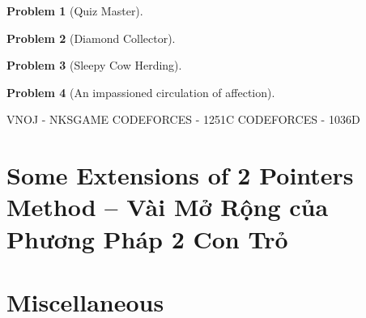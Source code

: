 \documentclass{article}
\newtheorem{problem}{Problem}
\begin{document}
\begin{problem}[Quiz Master]

\end{problem}

\begin{problem}[Diamond Collector]

\end{problem}

\begin{problem}[Sleepy Cow Herding]

\end{problem}

\begin{problem}[An impassioned circulation of affection]

\end{problem}

VNOJ - NKSGAME
CODEFORCES - 1251C
CODEFORCES - 1036D


\section{Some Extensions of 2 Pointers Method -- Vài Mở Rộng của Phương Pháp 2 Con Trỏ}




\section{Miscellaneous}


\printbibliography[heading=bibintoc]
\end{document}
